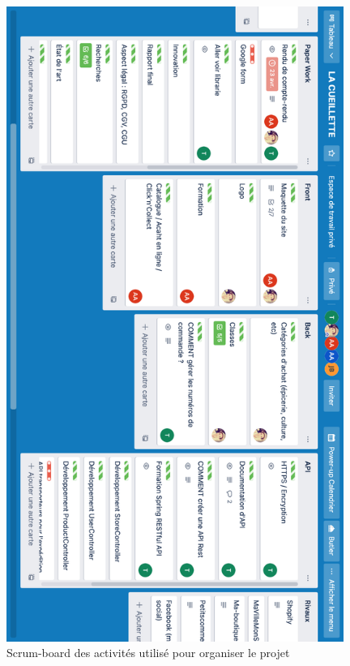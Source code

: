 \documentclass[a4paper, 12pt]{article}
\begin{document}
\begin{figure}[H]
	\begin{center}
		\includegraphics[width=11cm]{fig/trello.png}
		\caption*{Scrum-board des activités utilisé pour organiser le projet}
	\end{center}
\end{figure}
\end{document}
